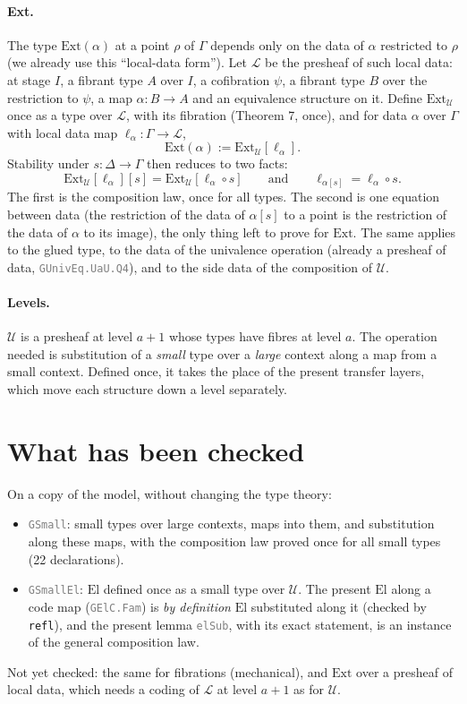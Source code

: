 \documentclass[11pt]{article}
\newcommand{\seg}[1]{\textcolor{gray}{\texttt{\small #1}}}
\newcommand{\El}{\mathrm{El}}
\newcommand{\Ext}{\mathrm{Ext}}
\newcommand{\U}{\mathcal{U}}
\newcommand{\LD}{\mathcal{L}}
\theoremstyle{remark}
\begin{document}
\paragraph{Ext.}  The type $\Ext(\alpha)$ at a point $\rho$ of $\Gamma$
depends only on the data of $\alpha$ restricted to $\rho$ (we already use
this ``local-data form'').  Let $\LD$ be the presheaf of such local data:
at stage $I$, a fibrant type $A$ over $I$, a cofibration $\psi$, a fibrant
type $B$ over the restriction to $\psi$, a map $\alpha : B \to A$ and an
equivalence structure on it.  Define $\Ext_{\U}$ once as a type over $\LD$,
with its fibration (Theorem 7, once), and for data $\alpha$ over $\Gamma$
with local data map $\ell_\alpha : \Gamma \to \LD$,
\[ \Ext(\alpha) := \Ext_{\U}[\ell_\alpha]. \]
Stability under $s : \Delta \to \Gamma$ then reduces to two facts:
\[ \Ext_{\U}[\ell_\alpha][s] = \Ext_{\U}[\ell_\alpha \circ s]
   \qquad\text{and}\qquad \ell_{\alpha[s]} = \ell_\alpha \circ s . \]
The first is the composition law, once for all types.  The second is one
equation between data (the restriction of the data of $\alpha[s]$ to a
point is the restriction of the data of $\alpha$ to its image), the only
thing left to prove for $\Ext$.  The same applies to the glued type, to
the data of the univalence operation (already a presheaf of data,
\seg{GUnivEq.UaU.Q4}), and to the side data of the composition of $\U$.

\paragraph{Levels.}  $\U$ is a presheaf at level $a{+}1$ whose types have
fibres at level $a$.  The operation needed is substitution of a
\emph{small} type over a \emph{large} context along a map from a small
context.  Defined once, it takes the place of the present transfer
layers, which move each structure down a level separately.

\section{What has been checked}

On a copy of the model, without changing the type theory:
\begin{itemize}
\item \seg{GSmall}: small types over large contexts, maps into them, and
  substitution along these maps, with the composition law proved once for
  all small types (22 declarations).
\item \seg{GSmallEl}: $\El$ defined once as a small type over $\U$.  The
  present $\El$ along a code map (\seg{GElC.Fam}) is \emph{by definition}
  $\El$ substituted along it (checked by \texttt{refl}), and the present
  lemma \seg{elSub}, with its exact statement, is an instance of the
  general composition law.
\end{itemize}
Not yet checked: the same for fibrations (mechanical), and $\Ext$ over a
presheaf of local data, which needs a coding of $\LD$ at level $a{+}1$ as
for $\U$.
\end{document}
